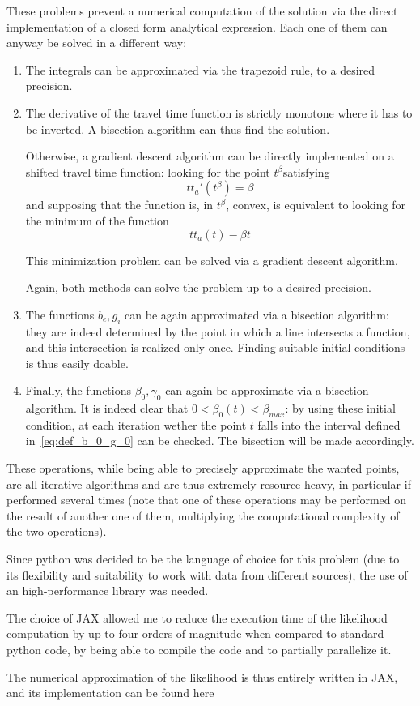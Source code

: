 These problems prevent a numerical computation of the solution via the direct implementation of a closed form analytical expression.
Each one of them can anyway be solved in a different way:
\begin{enumerate}
\item The integrals can be approximated via the trapezoid rule,
  to a desired precision.
\item The derivative of the travel time function is strictly monotone where it has to be inverted.
  A bisection algorithm can thus find the solution.

  Otherwise, a gradient descent algorithm can be directly implemented on a shifted travel time function:
  looking for the point \(t^\beta\)satisfying
  \begin{equation*}
    tt_a'(t^\beta) = \beta
  \end{equation*}
  and supposing that the function is, in \(t^\beta\), convex,
  is equivalent to looking for the minimum of the function
  \begin{equation*}
    tt_a(t) - \beta t
  \end{equation*}

  This minimization problem can be solved via a gradient descent algorithm.

  Again, both methods can solve the problem up to a desired precision.
\item The functions \(b_e, g_i\) can be again approximated via a bisection algorithm:
  they are indeed determined by the point in which a line intersects a function,
  and this intersection is realized only once.
  Finding suitable initial conditions is thus easily doable.
\item Finally, the functions \(\beta_0, \gamma_0\) can again be approximate via a bisection algorithm.
  It is indeed clear that \(0 < \beta_0(t) < \beta_{max}\):
  by using these initial condition,
  at each iteration wether the point \(t\) falls into the interval defined in~\eqref{eq:def_b_0_g_0} can be checked.
  The bisection will be made accordingly.
\end{enumerate}

These operations, while being able to precisely approximate the wanted points,
are all iterative algorithms and are thus extremely resource-heavy,
in particular if performed several times
(note that one of these operations may be performed on the result of another one of them,
multiplying the computational complexity of the two operations).

Since python was decided to be the language of choice for this problem
(due to its flexibility and suitability to work with data from different sources),
the use of an high-performance library was needed.

The choice of JAX allowed me to reduce the execution time of the likelihood computation by up to four orders of magnitude when compared to standard python code,
by being able to compile the code and to partially parallelize it.

The numerical approximation of the likelihood is thus entirely written in JAX,
and its implementation can be found here



